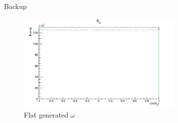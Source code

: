 \documentclass[
		10pt
		]{beamer}
\begin{document}
\appendix



\begin{frame}{Backup}

\begin{figure}
	\includegraphics[width=8cm]{Plots/OmegaFlat}
	\captionsetup{labelformat=empty}
	\caption{Flat generated $\omega$}
\end{figure}



\end{frame}
\end{document}
